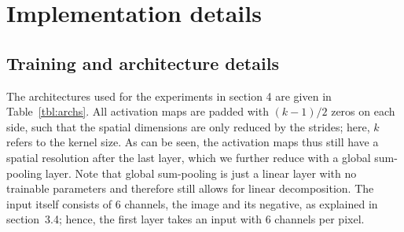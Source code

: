 \section{Implementation details}
\label{sec:training}
\subsection{Training and architecture details}
 The architectures used for the experiments in section 4 are given in Table~\ref{tbl:archs}.
All activation maps are padded with $(k - 1)/2$ zeros on each side, such that the spatial dimensions are only reduced by 
    the strides; here, $k$ refers to the kernel size.
As can be seen, the activation maps thus still have a spatial resolution after the last layer, which we further reduce with a global sum-pooling layer.
Note that global sum-pooling is just a linear layer with no trainable parameters and therefore still allows for linear decomposition.
The input itself consists of 6 channels, the image and its negative, as explained in section~3.4;
    hence, the first layer takes an input with 6 channels per pixel.


